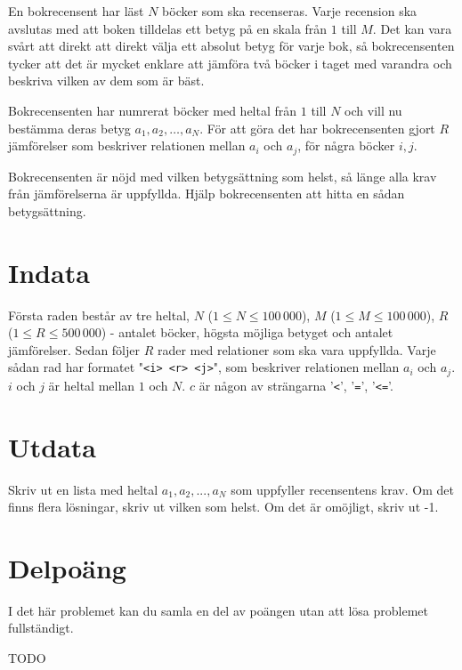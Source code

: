 
En bokrecensent har läst $N$ böcker som ska recenseras. Varje recension ska
avslutas med att boken tilldelas ett betyg på en skala från $1$ till $M$. Det kan
vara svårt att direkt att direkt välja ett absolut betyg för varje bok, så
bokrecensenten tycker att det är mycket enklare att jämföra två böcker i
taget med varandra och beskriva vilken av dem som är bäst.

Bokrecensenten har numrerat böcker med heltal från $1$ till $N$ och vill nu
bestämma deras betyg $a_1, a_2, \dots , a_N$. För att göra det har
bokrecensenten gjort $R$ jämförelser som beskriver relationen mellan $a_i$ och
$a_j$, för några böcker $i, j$.

Bokrecensenten är nöjd med vilken betygsättning som helst, så länge alla krav
från jämförelserna är uppfyllda. Hjälp bokrecensenten att hitta en sådan
betygsättning.

\section*{Indata}

Första raden består av tre heltal, $N$ ($1 \leq N \leq 100\,000$), 
$M$ ($1 \leq M \leq 100\,000$),
$R$ ($1 \leq R \leq 500\,000$) - antalet böcker, högsta möjliga
betyget och antalet jämförelser. Sedan följer $R$ rader med relationer som ska
vara
uppfyllda. Varje sådan rad har formatet "\texttt{<i> <r> <j>}",
som beskriver relationen mellan $a_i$ och $a_j$. $i$ och $j$ är heltal mellan
$1$ och $N$. $c$ är någon av strängarna '\texttt{<}', '\texttt{=}',
'\texttt{<=}'.

\section*{Utdata}

Skriv ut en lista med heltal $a_1, a_2, ... , a_N$ som uppfyller recensentens
krav. Om det finns flera lösningar, skriv ut vilken som helst. Om det är
omöjligt, skriv ut -1.

\section*{Delpoäng}

I det här problemet kan du samla en del av poängen utan att
lösa problemet fullständigt.

TODO
